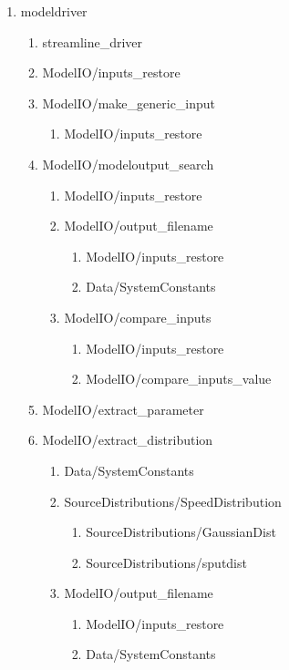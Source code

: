 \documentclass[11pt]{article}
\begin{document}
\begin{enumerate}
\item modeldriver
  \begin{enumerate}
  \item streamline\_driver
  \item ModelIO/inputs\_restore
  \item ModelIO/make\_generic\_input
    \begin{enumerate}
    \item ModelIO/inputs\_restore
    \end{enumerate}
  \item ModelIO/modeloutput\_search
    \begin{enumerate}
    \item ModelIO/inputs\_restore
    \item ModelIO/output\_filename
      \begin{enumerate}
      \item ModelIO/inputs\_restore
      \item Data/SystemConstants
      \end{enumerate}
    \item ModelIO/compare\_inputs
      \begin{enumerate}
      \item ModelIO/inputs\_restore
      \item ModelIO/compare\_inputs\_value
      \end{enumerate}
    \end{enumerate}
  \item ModelIO/extract\_parameter
  \item ModelIO/extract\_distribution
    \begin{enumerate}
    \item Data/SystemConstants
    \item SourceDistributions/SpeedDistribution
      \begin{enumerate}
      \item SourceDistributions/GaussianDist
      \item SourceDistributions/sputdist
      \end{enumerate}
    \item ModelIO/output\_filename
      \begin{enumerate}
      \item ModelIO/inputs\_restore
      \item Data/SystemConstants
      \end{enumerate}
    \end{enumerate}

\end{enumerate}
\end{enumerate}
\end{document}
